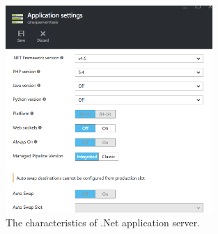 \begin{figure}[!htb]
  \centering
  \includegraphics[width=0.7\textwidth]{Figures/dotnetserver.png}
  \caption[The characteristics of .Net application server.]{The characteristics of .Net application server.}
  \label{fig:netserver}
\end{figure}
